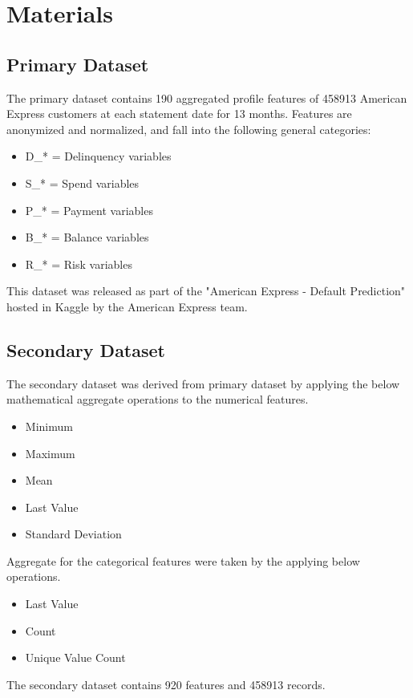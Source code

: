 \documentclass[twoside,11pt,a4paper]{article}
\begin{document}
\section{Materials}\label{sec:materials}

\subsection{Primary Dataset}
The primary dataset contains 190 aggregated profile features of 458913 American Express customers at each statement date for 13 months. Features are anonymized and normalized, and fall into the following general categories:

\begin{itemize}
	\item D\_* = Delinquency variables
	\item S\_* = Spend variables
	\item P\_* = Payment variables
	\item B\_* = Balance variables
	\item R\_* = Risk variables	
\end{itemize}

This dataset\citep{amex-default-prediction-dataset} was released as part of the "American Express - Default Prediction" hosted in Kaggle by the American Express team.

\subsection{Secondary Dataset}
The secondary dataset was derived from primary dataset by applying the below mathematical aggregate operations to the numerical features.
\begin{itemize}
	\item Minimum 
	\item Maximum
	\item Mean
	\item Last Value
	\item Standard Deviation
\end{itemize}

Aggregate for the categorical features were taken by the applying below operations.
\begin{itemize}
	\item Last Value
	\item Count
	\item Unique Value Count
\end{itemize}

The secondary dataset contains 920 features and 458913 records.
\end{document}
